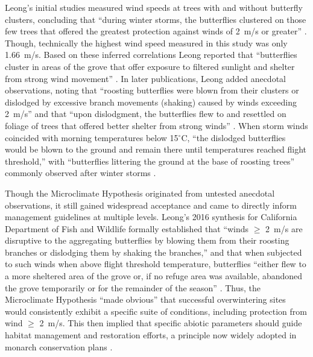\documentclass[insects,article,submit,pdftex,moreauthors]{Definitions/mdpi}
\begin{document}
Leong's initial studies measured wind speeds at trees with and without butterfly clusters, concluding that ``during winter storms, the butterflies clustered on those few trees that offered the greatest protection against winds of 2~m/s or greater'' \cite{leongMicroenvironmentalFactorsAssociated1990}. Though, technically the highest wind speed measured in this study was only 1.66~m/s. Based on these inferred correlations Leong reported that ``butterflies cluster in areas of the grove that offer exposure to filtered sunlight and shelter from strong wind movement'' \cite{leongUseMultivariateAnalyses1991}. In later publications, Leong added anecdotal observations, noting that ``roosting butterflies were blown from their clusters or dislodged by excessive branch movements (shaking) caused by winds exceeding 2~m/s'' and that ``upon dislodgment, the butterflies flew to and resettled on foliage of trees that offered better shelter from strong winds'' \cite{leongRestorationOverwinteringGrove1999}. When storm winds coincided with morning temperatures below 15$^{\circ}$C, ``the dislodged butterflies would be blown to the ground and remain there until temperatures reached flight threshold,'' with ``butterflies littering the ground at the base of roosting trees'' commonly observed after winter storms \cite{leongRestorationOverwinteringGrove1999}.

Though the Microclimate Hypothesis originated from untested anecdotal observations, it still gained widespread acceptance and came to directly inform management guidelines at multiple levels. Leong's 2016 synthesis for California Department of Fish and Wildlife formally established that ``winds $\geq$ 2~m/s are disruptive to the aggregating butterflies by blowing them from their roosting branches or dislodging them by shaking the branches,'' and that when subjected to such winds when above flight threshold temperature, butterflies ``either flew to a more sheltered area of the grove or, if no refuge area was available, abandoned the grove temporarily or for the remainder of the season'' \cite{leongEvaluationManagementCalifornia2016}. Thus, the Microclimate Hypothesis ``made obvious'' that successful overwintering sites would consistently exhibit a specific suite of conditions, including protection from wind $\geq$ 2~m/s. This then implied that specific abiotic parameters should guide habitat management and restoration efforts, a principle now widely adopted in monarch conservation plans \cite{xercessocietyStateMonarchOverwintering2016,jepsenProtectingCaliforniasButterfly2017,peltonMonarchButterflyOverwintering2020,weissRecommendationsRestorationMonarch2008,althouse&meadeinc.EllwoodMesaSperling2023}.
\end{document}
